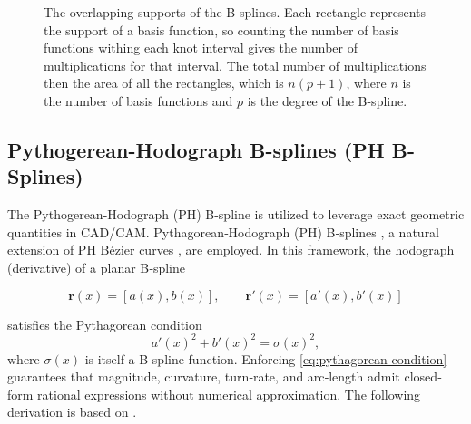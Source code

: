 \begin{figure}
    \centering
    
    \caption{The overlapping supports of the B-splines. Each rectangle represents the support of a basis function, so counting the number of basis functions withing each knot interval gives the number of multiplications for that interval. The total number of multiplications then the area of all the rectangles, which is $n(p+1)$, where $n$ is the number of basis functions and $p$ is the degree of the B-spline.}
    \label{fig:overlapping-bases}
\end{figure}


\subsection{Pythogerean-Hodograph B-splines (PH B-Splines)}\label{sec:pythogerean-hodograph}
The Pythogerean-Hodograph (PH) B-spline is utilized to leverage exact geometric quantities in CAD/CAM. Pythagorean‐Hodograph (PH) B‐splines \cite{Albrecht2016}, a natural extension of PH Bézier curves \cite{Farouki1990}, are employed. In this framework, the hodograph (derivative) of a planar B‐spline

\begin{equation*}
\mathbf r(x) = [a(x), b(x)],
\qquad
\mathbf r'(x) = [a'(x), b'(x)]
\end{equation*}

satisfies the Pythagorean condition
\begin{equation}\label{eq:pythagorean-condition}
a'(x)^2 + b'(x)^2 = \sigma(x)^2,
\end{equation}
where $\sigma(x)$ is itself a B‐spline function. Enforcing \cref{eq:pythagorean-condition} guarantees that magnitude, curvature, turn‐rate, and arc‐length admit closed‐form rational expressions without numerical approximation. The following derivation is based on \cite{Albrecht2016}.

